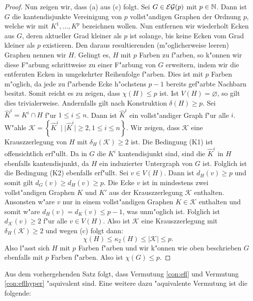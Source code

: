 \begin{proof}
  Nun zeigen wir, dass (a) aus (c) folgt. 
  Sei $G\in {\cal EG}(p) $ mit $p\in {\mathbb{N}}$. Dann ist $G$ die kantendisjunkte Vereinigung von $p$ vollst"andigen Graphen der Ordnung $p$, welche wir mit $K^{1},\dots, K^{p}$ bezeichnen wollen. Nun entfernen wir wiederholt Ecken aus $G$,  deren aktueller Grad kleiner als $p$ ist solange, bis keine Ecken vom Grad kleiner als $p$ existieren. Den daraus resultierenden (m"oglicherweise leeren) Graphen nennen wir $H$. 
  Gelingt es, $H$ mit $p$ Farben zu f"arben, so k"onnen wir diese F"arbung schrittweise zu einer F"arbung von $G$ erweitern, indem wir die entfernten Ecken in umgekehrter Reihenfolge f"arben. Dies ist mit $p$ Farben m"oglich, da jede zu f"arbende Ecke h"ochstens $p-1$ bereits gef"arbte Nachbarn besitzt.
  Somit reicht es zu zeigen, dass $\chi(H) \leq p$ ist. Ist $V(H) =\varnothing$, so gilt dies trivialerweise. Andernfalls gilt nach Konstruktion $\delta(H) \geq p $. 
  Sei $\hat{K}^i = K^{i} \cap H$ f"ur $1\leq i \leq n$. Dann ist $\hat{K}^i$ ein vollst"andiger Graph f"ur alle $i$. W"ahle $\mathcal{K} = \left\{ \hat{K}^i \;|\; | \hat{K}^i| \geq 2  , 1\leq i \leq n\right\}$. Wir zeigen, dass $\mathcal{K}$ eine Krauszzerlegung von $H$ mit $\delta_{H}(\mathcal{K}) \geq 2$ ist.
  Die Bedingung (K1) ist offensichtlich erf"ullt. Da in $G$ die $K^{i}$ kantendisjunkt sind, sind die $\hat{K}^{i}$ in $H$ ebenfalls kantendisjunkt, da $H$ ein induzierter Untergraph von $G$ ist. Folglich ist die Bedingung (K2) ebenfalls erf"ullt. Sei $v\in V(H)$. Dann ist $d_{H}(v) \geq p$ und somit gilt $d_{G}(v) \geq d_H(v) \geq p$. 
  Die Ecke $v$ ist in mindestens zwei vollst"andigen Graphen $K$ und $K'$ aus der Krauszzerlegung $\mathcal{K}$ enthalten. 
  Ansonsten w"are $v$ nur in einem vollst"andigen Graphen $K \in \mathcal{K}$ enthalten und somit w"are $d_{H}(v) = d_{K}(v) \leq p-1$, was unm"oglich ist. 
  Folglich ist $d_{\mathcal{K}}(v) \geq 2$ f"ur alle $v \in V(H)$. Also ist $\mathcal{K}$ eine Krauszzerlegung mit $\delta_{H}(\mathcal{K}) \geq 2$ und wegen (c) folgt dann:
  \begin{equation*}
    \chi(H) \leq \kappa_{2}(H) \leq |\mathcal{K}| \leq p .
  \end{equation*}
  Also l"asst sich $H$ mit $p$ Farben f"arben und wir k"onnen wie oben beschrieben $G$ ebenfalls mit $p$ Farben f"arben. Also ist $\chi(G) \leq p$.
\end{proof}

Aus dem vorhergehenden Satz folgt, dass Vermutung \ref{con:efl} und Vermutung \ref{con:eflhyper} "aquivalent sind. Eine weitere dazu "aquivalente Vermutung ist die folgende:


